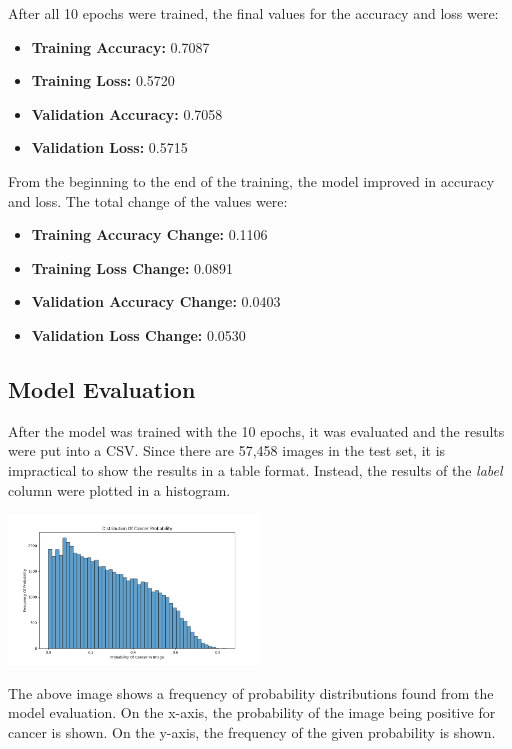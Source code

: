 \documentclass[
	a4paper, %
	10pt, %
	unnumberedsections, %
	twoside, %
]{LTJournalArticle}
\begin{document}
After all 10 epochs were trained, the final values for the accuracy and loss were:

\begin{itemize}
	\item \textbf{Training Accuracy:} 0.7087
	\item \textbf{Training Loss:} 0.5720
	\item \textbf{Validation Accuracy:} 0.7058
	\item \textbf{Validation Loss:} 0.5715
\end{itemize}

From the beginning to the end of the training, the model improved in accuracy and loss. The total change of the values were:

\begin{itemize}
	\item \textbf{Training Accuracy Change:} 0.1106
	\item \textbf{Training Loss Change:} 0.0891
	\item \textbf{Validation Accuracy Change:} 0.0403
	\item \textbf{Validation Loss Change:} 0.0530
\end{itemize}

\subsection{Model Evaluation}

After the model was trained with the 10 epochs, it was evaluated and the results were put into a CSV. Since there are 57,458 images in the test set, it is impractical to show the results in a table
format. Instead, the results of the \textit{label} column were plotted in a histogram.

\begin{center}
	\includegraphics[width=0.5\textwidth]{Figures/Positive Cancer Probability.png}
\end{center}

The above image shows a frequency of probability distributions found from the model evaluation. On the x-axis, the probability of the image being positive for cancer is shown. On the y-axis, the frequency
of the given probability is shown.
\end{document}
